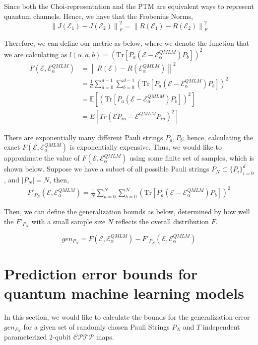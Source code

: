 \documentclass[%
 reprint,
superscriptaddress,
 amsmath,amssymb,
 aps,
]{revtex4-2}
\newcommand{\E}{\mathcal{E}}
\newcommand{\norm}[1]{\left\lVert#1\right\rVert}
\begin{document}
Since both the Choi-representation and the PTM are equivalent ways to represent quantum channels. Hence, we have that the Frobenius Norms,
\begin{equation}
    \norm{J(\E_1)-J(\E_2)}_F^2=\norm{R(\E_1)-R(\E_2)}_F^2
\end{equation}

Therefore, we can define our metric as below, where we denote the function that we are calculating as $l(\alpha, a, b) = \left(\mathrm{Tr}\left[P_a(\E-\E^{QMLM}_\alpha)P_b\right]\right)^2$
\begin{equation}
\begin{split}
    F(\E, \E^{QMLM}_\alpha) &= \norm{R(\E)-R(\E^{QMLM}_\alpha)}^2\\
    &=\frac{1}{d}\sum_{a=0}^{d-1}\sum_{b=0}^{d-1}\left(\mathrm{Tr}\left[P_a(\E-\E^{QMLM}_\alpha)P_b\right]\right)^2\\
    &=\mathbb{E}\left[\left(\mathrm{Tr}\left[P_a(\E-\E^{QMLM}_\alpha)P_b\right]\right)^2\right]\\
    &=E [Tr(\E P_{in}-\E^{QMLM} P_{in})^2]
\end{split}
\end{equation}

There are exponentially many different Pauli strings $P_a, P_b$; hence, calculating the exact $F(\E, \E^{QMLM}_\alpha)$ is exponentially expensive. Thus, we would like to approximate the value of $F(\E, \E^{QMLM}_\alpha)$ using some finite set of samples, which is shown below. Suppose we have a subset of all possible Pauli strings $P_N\subset\{P_i\}_{i=0}^{d}$, and $|P_N|=N$, then,
\begin{equation}
\begin{split}
    F'_{P_N}(\E, \E^{QMLM}_\alpha)
    =\frac{1}{N}\sum_{a=0}^{N}\sum_{b=0}^{N}\left(\mathrm{Tr}\left[P_a(\E-\E^{QMLM}_\alpha)P_b\right]\right)^2
\end{split}
\end{equation}

Then, we can define the generalization bounds as below, determined by how well the $F'_{P_N}$ with a small sample size $N$ reflects the overall distribution $F$.

\begin{equation}
    gen_{P_N}=F(\E, \E^{QMLM}_\alpha) - F'_{P_N}(\E, \E^{QMLM}_\alpha)
\end{equation}

\section{Prediction error bounds for quantum machine learning models}
In this section, we would like to calculate the bounds for the generalization error $gen_{P_N}$ for a given set of randomly chosen Pauli Strings $P_N$ and $T$ independent parameterized 2-qubit $\mathcal{CPTP}$ maps.
\end{document}
